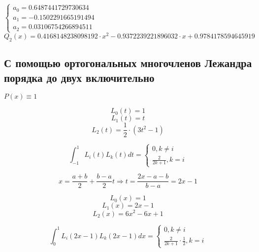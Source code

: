 $
 \begin{cases}
  a_0 = 0.6487441729730634
\\
  a_1 = -0.1502291665191494
\\
  a_2 = 0.03106754266894511
 \end{cases}
$\\[1mm]

\begin{displaymath}
Q_2(x) = 0.4168148238098192 \cdot x^2 - 0.9372239221896032 \cdot x + 0.9784178594645919
\end{displaymath}

\subsection{С помощью ортогональных многочленов Лежандра порядка до двух включительно}

$P(x) \equiv 1$

\begin{displaymath}
L_0(t) = 1
\end{displaymath}
\begin{displaymath}
L_1(t) = t
\end{displaymath}
\begin{displaymath}
L_2(t) = \frac{1}{2} \cdot (3t^2 - 1)
\end{displaymath}

\begin{displaymath}
\int_{-1}^{1} L_i(t) L_k(t) dt = \begin{cases} 0, k \neq i \\ \frac{2}{2k + 1}, k = i \end{cases}
\end{displaymath}

\begin{displaymath}
x = \frac{a + b}{2} + \frac{b - a}{2} t \Rightarrow t = \frac{2x - a - b}{b - a} = 2x - 1
\end{displaymath}

\begin{displaymath}
L_0(x) = 1
\end{displaymath}
\begin{displaymath}
L_1(x) = 2x - 1
\end{displaymath}
\begin{displaymath}
L_2(x) = 6x^2 - 6x + 1
\end{displaymath}

\begin{displaymath}
\int_0^1 L_i(2x - 1) L_k(2x - 1) dx = \begin{cases} 0, k \neq i \\ \frac{2}{2k + 1} \cdot \frac{1}{2}, k = i \end{cases}
\end{displaymath}

